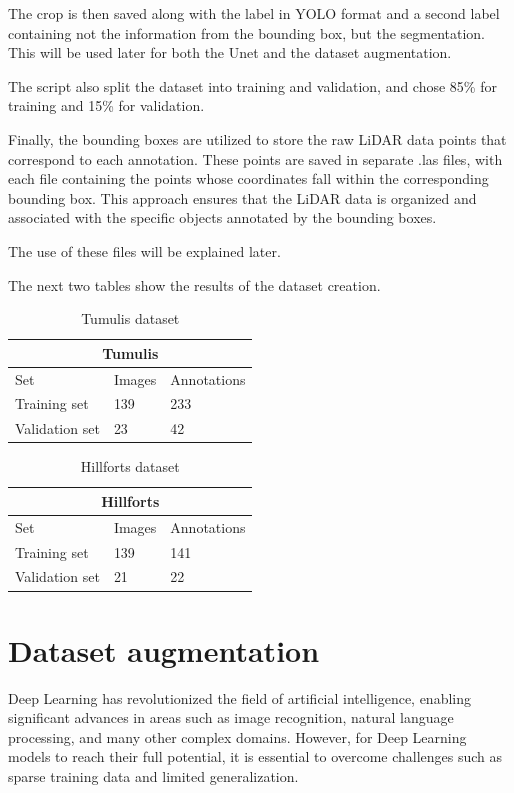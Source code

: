 The crop is then saved along with the label in YOLO format and a second label containing not the information from the bounding box, but the segmentation. This will be used later for both the Unet and the dataset augmentation.

The script also split the dataset into training and validation, and chose 85\% for training and 15\% for validation.

Finally, the bounding boxes are utilized to store the raw LiDAR data points that correspond to each annotation. These points are saved in separate .las files, with each file containing the points whose coordinates fall within the corresponding bounding box. This approach ensures that the LiDAR data is organized and associated with the specific objects annotated by the bounding boxes.

The use of these files will be explained later.

The next two tables show the results of the dataset creation.

\begin{table}[H]
\centering
\begin{tabular}{|p{3cm}|p{2.5cm}|p{2cm}|} 
\hline
\multicolumn{3}{|c|}{Tumulis} \\
 \hline
  Set & Images & Annotations\\ [0.5ex] 
 \hline
 Training set & 139 & 233 \\ 
 Validation set & 23 & 42  \\[1ex]
 \hline
\end{tabular}
\caption{Tumulis dataset}
\end{table} 

\begin{table}[H]
\centering
\begin{tabular}{|p{3cm}|p{2.5cm}|p{2cm}|} 
\hline
\multicolumn{3}{|c|}{Hillforts} \\
 \hline
  Set & Images & Annotations\\ [0.5ex] 
 \hline
 Training set & 139 & 141 \\ 
 Validation set & 21 & 22  \\[1ex]
 \hline
\end{tabular}
\caption{Hillforts dataset}
\end{table} 


\section{Dataset augmentation}
Deep Learning has revolutionized the field of artificial intelligence, enabling significant advances in areas such as image recognition, natural language processing, and many other complex domains. However, for Deep Learning models to reach their full potential, it is essential to overcome challenges such as sparse training data and limited generalization.

